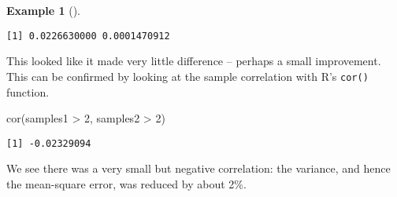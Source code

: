 \documentclass[
  letterpaper,
  DIV=11,
  numbers=noendperiod]{scrreprt}
\newenvironment{Shaded}{\begin{snugshade}}{\end{snugshade}}
\newcommand{\DecValTok}[1]{\textcolor[rgb]{0.68,0.00,0.00}{#1}}
\newcommand{\FunctionTok}[1]{\textcolor[rgb]{0.28,0.35,0.67}{#1}}
\newcommand{\NormalTok}[1]{\textcolor[rgb]{0.00,0.23,0.31}{#1}}
\newcommand{\SpecialCharTok}[1]{\textcolor[rgb]{0.37,0.37,0.37}{#1}}
\theoremstyle{plain}
\theoremstyle{definition}
\theoremstyle{definition}
\newtheorem{example}{Example}[chapter]
\theoremstyle{remark}
\begin{document}
\begin{example}[]
\begin{verbatim}
[1] 0.0226630000 0.0001470912
\end{verbatim}

This looked like it made very little difference -- perhaps a small
improvement. This can be confirmed by looking at the sample correlation
with R's \texttt{cor()} function.

\begin{Shaded}
\begin{Highlighting}[]
\FunctionTok{cor}\NormalTok{(samples1 }\SpecialCharTok{\textgreater{}} \DecValTok{2}\NormalTok{, samples2 }\SpecialCharTok{\textgreater{}} \DecValTok{2}\NormalTok{)}
\end{Highlighting}
\end{Shaded}

\begin{verbatim}
[1] -0.02329094
\end{verbatim}

We see there was a very small but negative correlation: the variance,
and hence the mean-square error, was reduced by about 2\%.

\end{example}
\end{document}
